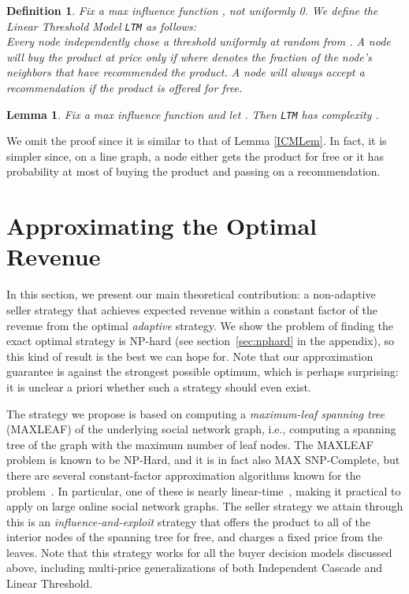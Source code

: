 \documentclass[letterpaper,twoside]{article}
\newtheorem{lemma}{Lemma}
\newtheorem{defn}{Definition}
\newcommand{\LTM}[1]{\texttt{LTM}}
\newcommand{\maxleaf}{\textrm{M{\scriptsize AX}\-L{\scriptsize EAF}}}
\begin{document}
\begin{defn}
    Fix a max influence function , not
    uniformly 0. We define the {\em Linear Threshold Model} \LTM{B}
    as follows:\\
    Every node independently chose a threshold  uniformly at
    random from . A node will buy the product at price  only if
     where  denotes the
    fraction of the node's neighbors that have recommended the
    product. A node will always accept a recommendation if the
    product is offered for free.
\end{defn}

\begin{lemma}
    Fix a max influence function  and let
    . Then \LTM{B} has complexity .
\end{lemma}

We omit the proof since it is similar to that of Lemma \ref{ICMLem}.
In fact, it is simpler since, on a line graph, a node either gets
the product for free or it has probability at most  of
buying the product and passing on a recommendation.

\section{Approximating the Optimal Revenue}
\label{sec:approxalg}
In this section, we present our main theoretical contribution: a non-adaptive
seller strategy that achieves expected revenue within a constant factor of
the revenue from the optimal {\em adaptive} strategy.  We show the problem of
finding the exact optimal strategy is NP-hard (see section~\ref{sec:nphard}
in the appendix), so this kind of result is the best we can hope for.  Note
that our approximation guarantee is against the strongest possible optimum,
which is perhaps surprising: it is unclear a priori whether such a strategy
should even exist.

The strategy we propose is based on computing a {\em maximum-leaf
  spanning tree} (\maxleaf) of the underlying social network graph,
i.e., computing a spanning tree of the graph with the maximum number
of leaf nodes. The \maxleaf{} problem is known to be NP-Hard, and it
is in fact also MAX SNP-Complete, but there are several
constant-factor approximation algorithms known for the
problem~\cite{GJ79,KW91,LR98,Solis98}. In particular, one of these
is nearly linear-time~\cite{LR98}, making it practical to apply on
large online social network graphs. The seller strategy we attain
through this is an {\em influence-and-exploit} strategy that offers
the product to all of the interior nodes of the spanning tree for
free, and charges a fixed price from the leaves. Note that this
strategy works for all the buyer decision models discussed above,
including multi-price generalizations of both Independent Cascade
and Linear Threshold.
\end{document}
